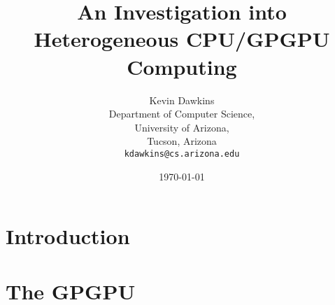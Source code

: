 \documentclass[12pt,notitlepage]{report}
\begin{document}
\title{An Investigation into Heterogeneous CPU/GPGPU Computing}
\author{Kevin Dawkins\\
  Department of Computer Science,\\
  University of Arizona,\\
  Tucson, Arizona\\
  \texttt{kdawkins@cs.arizona.edu}}
\date{\today}
\maketitle



\tableofcontents

\chapter*{Introduction}


\chapter*{The GPGPU}

\end{document}
